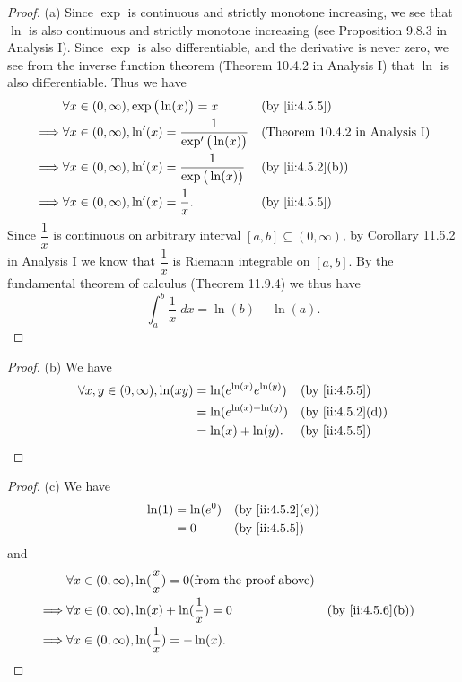 \begin{proof}{(a)}
  Since \(\exp\) is continuous and strictly monotone increasing, we see that \(\ln\) is also continuous and strictly monotone increasing (see Proposition 9.8.3 in Analysis I).
  Since \(\exp\) is also differentiable, and the derivative is never zero, we see from the inverse function theorem (Theorem 10.4.2 in Analysis I) that \(\ln\) is also differentiable.
  Thus we have
  \begin{align*}
             & \forall x \in (0, \infty), \exp\big(\ln(x)\big) = x                   &  & \by{ii:4.5.5}                         \\
    \implies & \forall x \in (0, \infty), \ln'(x) = \dfrac{1}{\exp'\big(\ln(x)\big)} &  & \text{(Theorem 10.4.2 in Analysis I)} \\
    \implies & \forall x \in (0, \infty), \ln'(x) = \dfrac{1}{\exp\big(\ln(x)\big)}  &  & \by{ii:4.5.2}[b]                      \\
    \implies & \forall x \in (0, \infty), \ln'(x) = \dfrac{1}{x}.                    &  & \by{ii:4.5.5}
  \end{align*}
  Since \(\dfrac{1}{x}\) is continuous on arbitrary interval \([a, b] \subseteq (0, \infty)\), by Corollary 11.5.2 in Analysis I we know that \(\dfrac{1}{x}\) is Riemann integrable on \([a, b]\).
  By the fundamental theorem of calculus (Theorem 11.9.4) we thus have
  \[
    \int_a^b \dfrac{1}{x} \; dx = \ln(b) - \ln(a).
  \]
\end{proof}

\begin{proof}{(b)}
  We have
  \begin{align*}
    \forall x, y \in (0, \infty), \ln(xy) & = \ln(e^{\ln(x)} e^{\ln(y)}) &  & \by{ii:4.5.5}    \\
                                          & = \ln(e^{\ln(x) + \ln(y)})   &  & \by{ii:4.5.2}[d] \\
                                          & = \ln(x) + \ln(y).           &  & \by{ii:4.5.5}
  \end{align*}
\end{proof}

\begin{proof}{(c)}
  We have
  \begin{align*}
    \ln(1) & = \ln(e^0) &  & \by{ii:4.5.2}[e] \\
           & = 0        &  & \by{ii:4.5.5}
  \end{align*}
  and
  \begin{align*}
             & \forall x \in (0, \infty), \ln(\dfrac{x}{x}) = 0 \text{(from the proof above)}                       \\
    \implies & \forall x \in (0, \infty), \ln(x) + \ln(\dfrac{1}{x}) = 0                      &  & \by{ii:4.5.6}[b] \\
    \implies & \forall x \in (0, \infty), \ln(\dfrac{1}{x}) = -\ln(x).
  \end{align*}
\end{proof}

